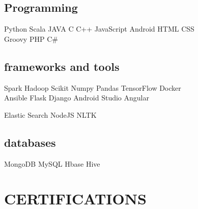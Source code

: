 \documentclass[]{deedy-resume-openfont}
\begin{document}
\begin{minipage}[t]{0.33\textwidth}
\subsection{Programming}
Python \textbullet{} Scala \textbullet{} JAVA \textbullet{} C \textbullet{} C++ \textbullet{} JavaScript \textbullet{} Android \textbullet{} HTML \textbullet{} CSS \\
\vspace{1mm}
Groovy \textbullet{} PHP \textbullet{} C\#
\sectionsep

\subsection{frameworks and tools} 

Spark \textbullet{} Hadoop \textbullet{} Scikit \textbullet{} Numpy \textbullet{} Pandas \textbullet{} TensorFlow \textbullet{} Docker \\ \textbullet{} Ansible  \textbullet{} Flask \textbullet{} Django \textbullet{} Android Studio \textbullet{} Angular \\

\vspace{1mm}

 \textbullet{} Elastic Search \textbullet{} NodeJS \textbullet{} NLTK

\sectionsep

\subsection{databases}
MongoDB \textbullet{} MySQL \textbullet{} Hbase \textbullet{} Hive \sectionsep


\section{CERTIFICATIONS} 

\vspace{1mm}
\vspace{1mm}
\vspace{1mm}

%
%

\end{minipage} 
\end{document}
